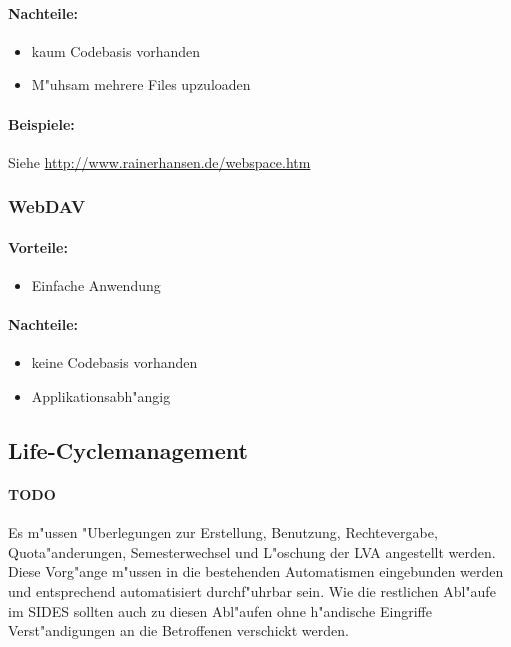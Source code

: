 \documentclass[12pt,a4paper]{article}
\begin{document}
\paragraph{Nachteile: }
\begin{itemize}
\item{kaum Codebasis vorhanden}
\item{M"uhsam mehrere Files upzuloaden}
\end{itemize}

\paragraph{Beispiele:} Siehe \url{http://www.rainerhansen.de/webspace.htm}

\subsubsection{WebDAV}

\paragraph{Vorteile: }
\begin{itemize}
\item{Einfache Anwendung}
\end{itemize}
\paragraph{Nachteile: }
\begin{itemize}
\item{keine Codebasis vorhanden}
\item{Applikationsabh"angig}
\end{itemize}


\subsection{Life-Cyclemanagement}

\paragraph{TODO}{Es m"ussen "Uberlegungen zur Erstellung, Benutzung,
Rechtevergabe, Quota"anderungen, Semesterwechsel und L"oschung der LVA
angestellt werden. Diese Vorg"ange m"ussen in die bestehenden Automatismen
eingebunden werden und entsprechend automatisiert durchf"uhrbar sein.  Wie
die restlichen Abl"aufe im SIDES sollten auch zu diesen Abl"aufen ohne
h"andische Eingriffe Verst"andigungen an die Betroffenen verschickt
werden.}
\end{document}
